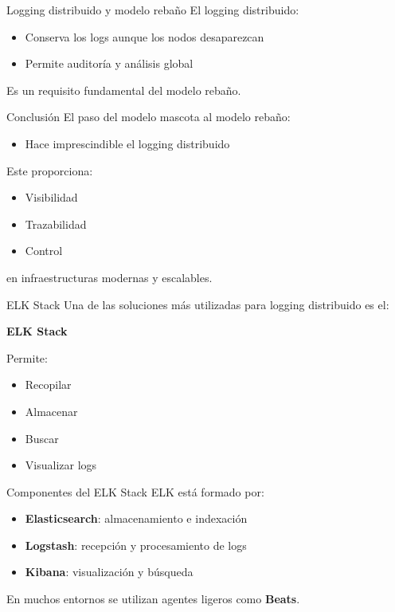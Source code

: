 \documentclass{beamer}
\begin{document}
\begin{frame}{Logging distribuido y modelo rebaño}
El logging distribuido:
\begin{itemize}
    \item Conserva los logs aunque los nodos desaparezcan
    \item Permite auditoría y análisis global
\end{itemize}

\vspace{0.3cm}
Es un requisito fundamental del modelo rebaño.
\end{frame}

\begin{frame}{Conclusión}
El paso del modelo mascota al modelo rebaño:
\begin{itemize}
    \item Hace imprescindible el logging distribuido
\end{itemize}

\vspace{0.3cm}
Este proporciona:
\begin{itemize}
    \item Visibilidad
    \item Trazabilidad
    \item Control
\end{itemize}

\vspace{0.2cm}
en infraestructuras modernas y escalables.
\end{frame}


\begin{frame}{ELK Stack}
Una de las soluciones más utilizadas para logging distribuido es el:
\begin{center}
\textbf{ELK Stack}
\end{center}

\vspace{0.3cm}
Permite:
\begin{itemize}
    \item Recopilar
    \item Almacenar
    \item Buscar
    \item Visualizar logs
\end{itemize}
\end{frame}

\begin{frame}{Componentes del ELK Stack}
ELK está formado por:
\begin{itemize}
    \item \textbf{Elasticsearch}: almacenamiento e indexación
    \item \textbf{Logstash}: recepción y procesamiento de logs
    \item \textbf{Kibana}: visualización y búsqueda
\end{itemize}

\vspace{0.3cm}
En muchos entornos se utilizan agentes ligeros como \textbf{Beats}.
\end{frame}
\end{document}
